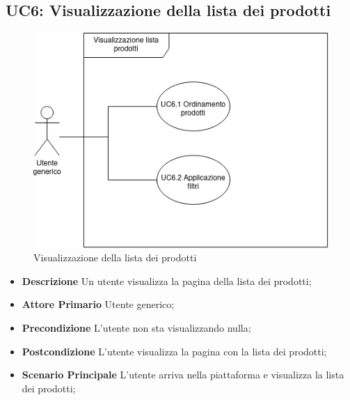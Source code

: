         \subsection{UC6: Visualizzazione della lista dei prodotti}
        \begin{figure}[!ht]
            \caption{Visualizzazione della lista dei prodotti}
            \vspace{10px}
            \includegraphics[scale=0.5]{../../../Images/AnalisiRequisiti/UC6.png}
            \centering
        \end{figure}
        \begin{itemize}
            \item \textbf{Descrizione} Un utente visualizza la pagina della lista dei prodotti;
            \item \textbf{Attore Primario} Utente generico;
            \item \textbf{Precondizione} L'utente non sta visualizzando nulla;
            \item \textbf{Postcondizione} L'utente visualizza la pagina con la lista dei prodotti;
            \item \textbf{Scenario Principale} L'utente arriva nella piattaforma e visualizza la lista dei prodotti;
        \end{itemize}
